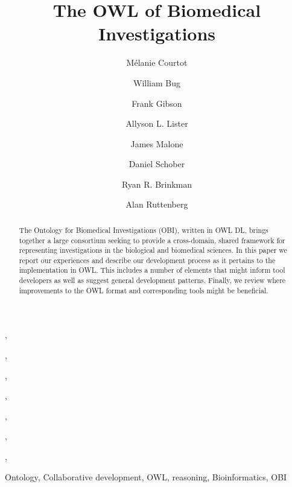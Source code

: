 \documentclass{elsart}       %
\begin{document}
\begin{frontmatter}

\title{The OWL of Biomedical Investigations}


\author[tfl]{M\'elanie Courtot},
\author[ucsd]{William Bug},
\author[new]{Frank Gibson},
\author[cisban]{Allyson L. Lister},
\author[ebi]{James Malone},
\author[ebi,IMBI]{Daniel Schober},
\author[tfl]{Ryan R. Brinkman},
\author[sc]{Alan Ruttenberg}



\medskip


\address[tfl]{Terry Fox Laboratory, British Columbia Cancer Research Center, Vancouver, BC, Canada}
\address[ucsd]{National Center for Microscopy Imaging Research, UCSD, CA, USA}
\address[new]{School of Computing Science, Newcastle University, Newcastle upon Tyne, UK}
\address[cisban]{CISBAN and School of Computing Science, Newcastle University, Newcastle upon Tyne, UK}
\address[ebi]{The European Bioinformatics Institute, Cambridge, CB101SD, UK}
\address[IMBI]{Institute of Medical Biometry and Medical Informatics (IMBI), University Medical Center, 70104 Freiburg, Germany}
\address[sc]{Science Commons, Cambridge, MA, USA}

\begin{abstract} 

The Ontology for Biomedical Investigations (OBI), written in OWL DL, brings together a large consortium seeking to provide a cross-domain, shared framework for representing investigations in the biological and biomedical sciences. In this paper we report our experiences and describe our development process as it pertains to the implementation in OWL.
This includes a number of elements that might inform tool developers as well as suggest general development patterns.
Finally, we review where improvements to the OWL format and corresponding tools might be beneficial.

\end{abstract}


\begin{keyword}
Ontology, Collaborative development, OWL, reasoning, Bioinformatics, OBI
\end{keyword}
\end{frontmatter}
\end{document}
